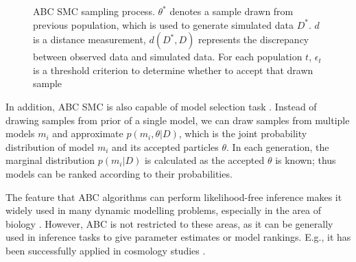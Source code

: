 \begin{figure}[t]
    \begin{center}
    \end{center}

    \caption[ABC SMC sampling process]%
    {ABC SMC sampling process. $\theta^*$ denotes a sample drawn from previous population, which is used to generate simulated data $D^*$. $d$ is a distance measurement, $d(D^*,D)$ represents the discrepancy between observed data and simulated data. For each population $t$, $\epsilon_t$ is a threshold criterion to determine whether to accept that drawn sample}
    \label{fig:smc}

\end{figure}

In addition, ABC SMC is also capable of model selection task \cite{model_compare}. Instead of drawing samples from prior of a single model, we can draw samples from multiple models $m_i$ and approximate $p(m_i, \theta|D)$, which is the joint probability distribution of model $m_i$ and its accepted particles $\theta$. In each generation, the marginal distribution $p(m_i|D)$ is calculated as the accepted ${\theta}$ is known; thus models can be ranked according to their probabilities.

The feature that ABC algorithms can perform likelihood-free inference makes it widely used in many dynamic modelling problems, especially in the area of biology \cite{ref:abcsysbio, ref:disease, ref:compare}. However, ABC is not restricted to these areas, as it can be generally used in inference tasks to give parameter estimates or model rankings. E.g., it has been successfully applied in cosmology studies \cite{cosmology}.



